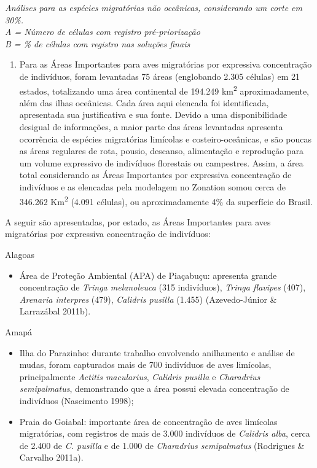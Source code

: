 \documentclass[
  oneside]{scrbook}
\providecommand{\tightlist}{%
  \setlength{\itemsep}{0pt}\setlength{\parskip}{0pt}}
\begin{document}
\emph{Análises para as espécies migratórias não oceânicas, considerando um corte em 30\%.}\\
\emph{A = Número de células com registro pré-priorização}\\
\emph{B = \% de células com registro nas soluções finais}

\begin{enumerate}
\def\labelenumi{(\arabic{enumi})}
\setcounter{enumi}{1}
\tightlist
\item
  Para as Áreas Importantes para aves migratórias por expressiva concentração de indivíduos, foram levantadas 75 áreas (englobando 2.305 células) em 21 estados, totalizando uma área continental de 194.249 km\textsuperscript{2} aproximadamente, além das ilhas oceânicas. Cada área aqui elencada foi identificada, apresentada sua justificativa e sua fonte. Devido a uma disponibilidade desigual de informações, a maior parte das áreas levantadas apresenta ocorrência de espécies migratórias limícolas e costeiro-oceânicas, e são poucas as áreas regulares de rota, pousio, descanso, alimentação e reprodução para um volume expressivo de indivíduos florestais ou campestres. Assim, a área total considerando as Áreas Importantes por expressiva concentração de indivíduos e as elencadas pela modelagem no Zonation somou cerca de 346.262 Km\textsuperscript{2} (4.091 células), ou aproximadamente 4\% da superfície do Brasil.
\end{enumerate}

A seguir são apresentadas, por estado, as Áreas Importantes para aves migratórias por expressiva concentração de indivíduos:

Alagoas

\begin{itemize}
\tightlist
\item
  Área de Proteção Ambiental (APA) de Piaçabuçu: apresenta grande concentração de \emph{Tringa melanoleuca} (315 indivíduos), \emph{Tringa flavipes} (407), \emph{Arenaria interpres} (479), \emph{Calidris pusilla} (1.455) (Azevedo-Júnior \& Larrazábal 2011b).
\end{itemize}

Amapá

\begin{itemize}
\item
  Ilha do Parazinho: durante trabalho envolvendo anilhamento e análise de mudas, foram capturados mais de 700 indivíduos de aves limícolas, principalmente \emph{Actitis macularius}, \emph{Calidris pusilla} e \emph{Charadrius semipalmatus}, demonstrando que a área possui elevada concentração de indivíduos (Nascimento 1998);
\item
  Praia do Goiabal: importante área de concentração de aves limícolas migratórias, com registros de mais de 3.000 indivíduos de \emph{Calidris alba}, cerca de 2.400 de \emph{C. pusilla} e de 1.000 de \emph{Charadrius semipalmatus} (Rodrigues \& Carvalho 2011a).
\end{itemize}
\end{document}
